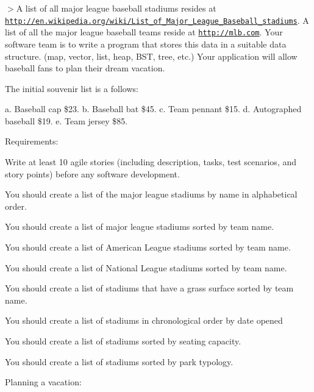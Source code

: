 $>$A list of all major league baseball stadiums resides at \href{http://en.wikipedia.org/wiki/List_of_Major_League_Baseball_stadiums}{\tt http\+://en.\+wikipedia.\+org/wiki/\+List\+\_\+of\+\_\+\+Major\+\_\+\+League\+\_\+\+Baseball\+\_\+stadiums}. A list of all the major league baseball teams reside at \href{http://mlb.com}{\tt http\+://mlb.\+com}. Your software team is to write a program that stores this data in a suitable data structure. (map, vector, list, heap, B\+ST, tree, etc.) Your application will allow baseball fans to plan their dream vacation.

The initial souvenir list is a follows\+:

a. Baseball cap \$23. b. Baseball bat \$45. c. Team pennant \$15. d. Autographed baseball \$19. e. Team jersey \$85.

Requirements\+:


\begin{DoxyEnumerate}
\item Write at least 10 agile stories (including description, tasks, test scenarios, and story points) before any software development.
\item You should create a list of the major league stadiums by name in alphabetical order.
\item You should create a list of major league stadiums sorted by team name.
\item You should create a list of American League stadiums sorted by team name.
\item You should create a list of National League stadiums sorted by team name.
\item You should create a list of stadiums that have a grass surface sorted by team name.
\item You should create a list of stadiums in chronological order by date opened
\item You should create a list of stadiums sorted by seating capacity.
\item You should create a list of stadiums sorted by park typology.
\end{DoxyEnumerate}

Planning a vacation\+:


